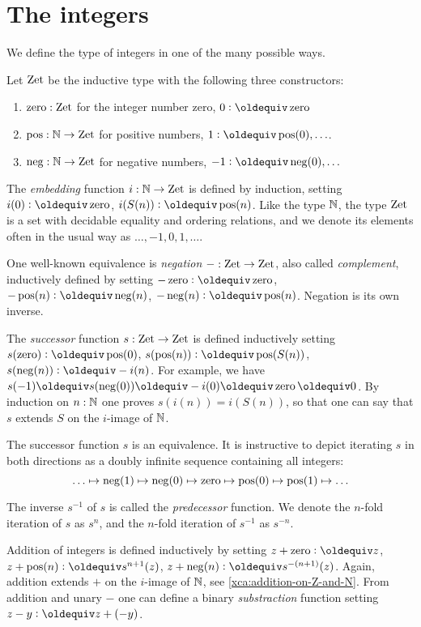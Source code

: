 \documentclass[a4,12pt]{amsart}
\begin{document}


\section{The integers}
\label{sec:integers}

We define the type of integers in one of the many possible ways.

\begin{definition}\label{def:integers}
Let $\mathrm{Zet}$ be the inductive type with the following three constructors:
\begin{enumerate}
\item $\mathop{\mathrm{zero}}: \mathrm{Zet}$ for the integer number zero, 
$0 \defeq \zzero$
\item $\mathop{\mathrm{pos}}: \mathbb{N} \to \mathrm{Zet}$ for positive numbers,
$1 \defeq \zpos(0),\ldots$.
\item $\mathop{\mathrm{neg}}: \mathbb{N} \to \mathrm{Zet}$ for negative numbers, 
$-1 \defeq \zneg(0),\ldots$
\end{enumerate}

The \emph{embedding} function $i:\mathbb{N}\to\mathrm{Zet}$ is defined by induction,
setting $i(0)\defeq \zzero$, $i(S(n))\defeq \zpos(n)$.
Like the type $\mathbb{N}$, the type $\mathrm{Zet}$ is a set with decidable equality
and ordering relations,
and we denote its elements often in the usual way as $\ldots,-1,0,1,\ldots$.

One well-known equivalence is \emph{negation} ${-}:\mathrm{Zet}\to\mathrm{Zet}$, 
also called \emph{complement}, inductively defined by setting 
$-\zzero\defeq \zzero$, 
$-\zpos(n)\defeq \zneg(n)$, 
$-\zneg(n)\defeq \zpos(n)$.
Negation is its own inverse.

The \emph{successor} function $s:\mathrm{Zet}\to\mathrm{Zet}$ is defined inductively setting 
$s(\zzero)\defeq \zpos(0)$, 
$s(\zpos(n))\defeq \zpos(S(n))$,
$s(\zneg(n))\defeq -i(n)$. For example, we have
$s(-1)\jdeq s(\zneg(0))\jdeq -i(0) \jdeq \zzero \jdeq 0$.
By induction on $n:\mathbb{N}$ one proves $s(i(n))=i(S(n))$, 
so that one can say that $s$ extends $S$
on the $i$-image of $\mathbb{N}$. 

The successor function $s$ is an equivalence.
It is instructive to depict iterating $s$ in both directions as 
a doubly infinite sequence containing all integers:
\[
\ldots \mapsto \mathop{\mathrm{neg}}(1) \mapsto \mathop{\mathrm{neg}}(0) \mapsto \mathop{\mathrm{zero}} \mapsto \mathop{\mathrm{pos}}(0) \mapsto \mathop{\mathrm{pos}}(1) \mapsto \ldots
\]

The inverse $s^{-1}$ of $s$ is called the \emph{predecessor} function.
We denote the $n$-fold iteration of $s$ as $s^n$, and
the $n$-fold iteration of $s^{-1}$ as $s^{-n}$.

Addition of integers is defined inductively by setting
$z + \zzero\defeq z$, 
$z + \zpos(n)\defeq s^{n+1}(z)$, 
$z + \zneg(n)\defeq s^{-(n+1)}(z)$.
Again, addition extends $+$ on the $i$-image of $\mathbb{N}$,
see \cref{xca:addition-on-Z-and-N}. 
From addition and unary $-$ one can define a binary
\emph{substraction} function setting $z-y \defeq z+(-y)$.
\end{definition}
\end{document}

